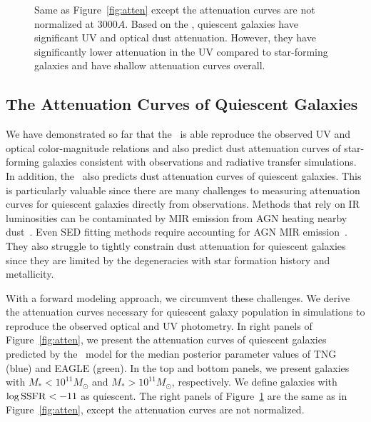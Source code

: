 \begin{figure}
\begin{center}
    \caption{\label{fig:raw_atten}
    Same as Figure~\ref{fig:atten} except the attenuation curves are not
    normalized at 3000$A$. Based on the \eda, quiescent galaxies have
    significant UV and optical dust attenuation. However, they have 
    significantly lower attenuation in the UV compared to star-forming 
    galaxies and have shallow attenuation curves overall.
    }
\end{center}
\end{figure}
\subsection{The Attenuation Curves of Quiescent Galaxies}  
We have demonstrated so far that the \eda~is able reproduce the observed UV and
optical color-magnitude relations and also predict dust attenuation curves
of star-forming galaxies consistent with observations and radiative transfer 
simulations. In addition, the \eda~also predicts dust attenuation curves of
quiescent galaxies. This is particularly valuable since there are many challenges 
to measuring attenuation curves for quiescent galaxies directly from observations. 
Methods that rely on IR luminosities can be contaminated by MIR emission from AGN
heating nearby dust~\citep{kirkpatrick2015}. Even SED fitting methods require 
accounting for AGN MIR emission~\citep{salim2016, leja2018, salim2018}. They
also struggle to tightly constrain dust attenuation for quiescent 
galaxies since they are limited by the degeneracies with star formation history and 
metallicity.

With a forward modeling approach, we circumvent these challenges. We derive the 
attenuation curves necessary for quiescent galaxy population in simulations to
reproduce the observed optical and UV photometry.  In right panels of
Figure~\ref{fig:atten}, we present the attenuation curves of quiescent galaxies 
predicted by the \eda~model for the median posterior parameter values of TNG (blue) 
and EAGLE (green). In the top and bottom panels, we present galaxies with 
$M_* < 10^{11} M_\odot$ and $M_* > 10^{11} M_\odot$, respectively. 
We define galaxies with $\log {\rm SSFR} < -11$ as quiescent. The right panels 
of Figure~\ref{fig:raw_atten} are the same as in Figure~\ref{fig:atten}, except
the attenuation curves are not normalized. 

